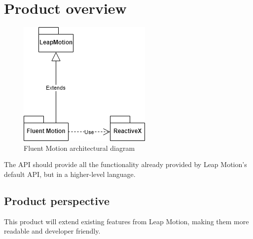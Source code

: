 \documentclass[12pt,a4paper,twoside]{report}
\begin{document}
\section{Product overview}
\begin{figure}
  \centering
  \includegraphics[width=\linewidth]{img/Product_arch.png}
  \caption{Fluent Motion architectural diagram}
  \label{fig:arch}
\end{figure}

The API should provide all the functionality already provided by Leap Motion's default API, but in a higher-level language.

\subsection{Product perspective}
This product will extend existing features from Leap Motion, making them more readable and developer friendly.
\end{document}
